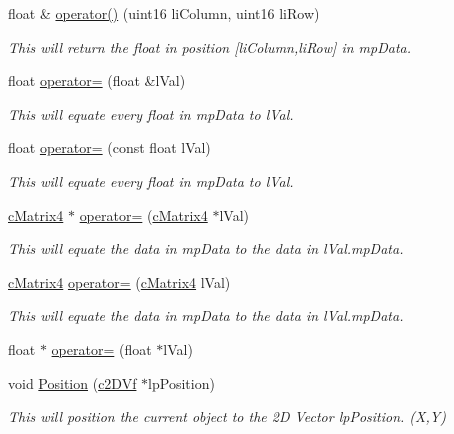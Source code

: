 \begin{DoxyCompactItemize}
float \& \hyperlink{classc_matrix4_a5d46493267b557040a30013c1aa18cdc}{operator()} (uint16 liColumn, uint16 liRow)
\begin{DoxyCompactList}\small\item\em This will return the float in position \mbox{[}liColumn,liRow\mbox{]} in mpData. \item\end{DoxyCompactList}\item 
float \hyperlink{classc_matrix4_ab80c930c0411334cc255112c8db84e61}{operator=} (float \&lVal)
\begin{DoxyCompactList}\small\item\em This will equate every float in mpData to lVal. \item\end{DoxyCompactList}\item 
float \hyperlink{classc_matrix4_ab027828400b348f735863af5de9103e7}{operator=} (const float lVal)
\begin{DoxyCompactList}\small\item\em This will equate every float in mpData to lVal. \item\end{DoxyCompactList}\item 
\hyperlink{classc_matrix4}{cMatrix4} $\ast$ \hyperlink{classc_matrix4_ad94edb7acda68ebad375ce919dc282ad}{operator=} (\hyperlink{classc_matrix4}{cMatrix4} $\ast$lVal)
\begin{DoxyCompactList}\small\item\em This will equate the data in mpData to the data in lVal.mpData. \item\end{DoxyCompactList}\item 
\hyperlink{classc_matrix4}{cMatrix4} \hyperlink{classc_matrix4_ab60d884663cacecfd8e5f68e3c317f78}{operator=} (\hyperlink{classc_matrix4}{cMatrix4} lVal)
\begin{DoxyCompactList}\small\item\em This will equate the data in mpData to the data in lVal.mpData. \item\end{DoxyCompactList}\item 
float $\ast$ \hyperlink{classc_matrix4_a7298504da2a4942e9f5c18f4db755481}{operator=} (float $\ast$lVal)
\item 
void \hyperlink{classc_matrix4_ac182a447e047d9071b035b374e8abf45}{Position} (\hyperlink{classc2_d_vf}{c2DVf} $\ast$lpPosition)
\begin{DoxyCompactList}\small\item\em This will position the current object to the 2D Vector lpPosition. (X,Y) \item\end{DoxyCompactList}\item 

\end{DoxyCompactItemize}
